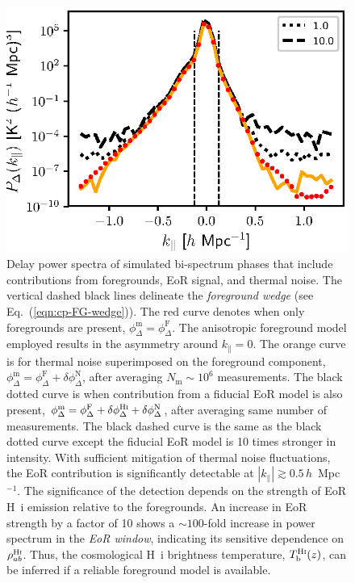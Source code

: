 \documentclass[
reprint,
superscriptaddress,
amsmath,
amssymb,
aps,
prd
]{revtex4-1}
\begin{document}
\begin{figure}[htb]
\includegraphics[width=\linewidth]{cpdps_150MHz_nsamples_1048576}
\caption{Delay power spectra of simulated bi-spectrum phases that include contributions from foregrounds, EoR signal, and thermal noise. The vertical dashed black lines delineate the {\it foreground wedge} (see Eq.~(\ref{eqn:cp-FG-wedge})). The red curve denotes when only foregrounds are present, $\phi_\Delta^\textrm{m}=\phi_\Delta^\textrm{F}$. The anisotropic foreground model employed \cite{thy15a} results in the asymmetry around $k_\parallel=0$. The orange curve is for thermal noise superimposed on the foreground component, $\phi_\Delta^\textrm{m}=\phi_\Delta^\textrm{F}+\delta\phi_\Delta^\textrm{N}$, after averaging $N_\textrm{m} \sim 10^6$ measurements. The black dotted curve is when contribution from a fiducial EoR model is also present, $\phi_\Delta^\textrm{m}=\phi_\Delta^\textrm{F}+\delta\phi_\Delta^\textrm{H{\sc i}}+\delta\phi_\Delta^\textrm{N}$, after averaging same number of measurements. The black dashed curve is the same as the black dotted curve except the fiducial EoR model is 10 times stronger in intensity. With sufficient mitigation of thermal noise fluctuations, the EoR contribution is significantly detectable at $|k_\parallel| \gtrsim 0.5\,h$~Mpc$^{-1}$. The significance of the detection depends on the strength of EoR H~{\sc i} emission relative to the foregrounds. An increase in EoR strength by a factor of 10 shows a $\sim 100$-fold increase in power spectrum in the {\it EoR window}, indicating its sensitive dependence on $\rho_{ab}^\textrm{H{\sc i}}$. Thus, the cosmological H~{\sc i} brightness temperature, $T_\textrm{b}^\textrm{H{\sc i}}(z)$, can be inferred if a reliable foreground model is available. \label{fig:cpdps}}
\end{figure}
\end{document}
